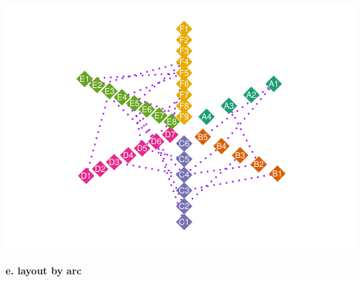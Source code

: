 \documentclass[
]{article}
\let\oldparagraph\paragraph
\renewcommand{\paragraph}[1]{\oldparagraph{#1}\mbox{}}
\begin{document}
\includegraphics{ReadMe_files/figure-latex/unnamed-chunk-14-1.pdf}

\hypertarget{e.-layout-by-arc}{%
\paragraph{e. layout by arc}\label{e.-layout-by-arc}}
\end{document}
